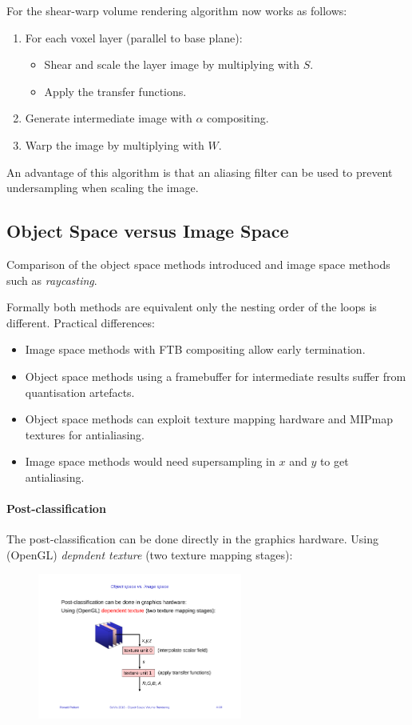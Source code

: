 For the shear-warp volume rendering algorithm now works as follows:
\begin{enumerate}
    \item For each voxel layer (parallel to base plane):
        \begin{itemize}
            \item Shear and scale the layer image by multiplying with $S$.
            \item Apply the transfer functions.
        \end{itemize}
    \item Generate intermediate image with $\alpha$ compositing.
    \item Warp the image by multiplying with $W$.
\end{enumerate}

An advantage of this algorithm is that an aliasing filter can be used to prevent undersampling when scaling the image.

\subsection{Object Space versus Image Space}
Comparison of the object space methods introduced and image space methods such as \emph{raycasting}.

Formally both methods are equivalent only the nesting order of the loops is different. Practical differences:
\begin{itemize}
    \item Image space methods with FTB compositing allow early termination.
    \item Object space methods using a framebuffer for intermediate results suffer from quantisation artefacts.
    \item Object space methods can exploit texture mapping hardware and MIPmap textures for antialiasing.
    \item Image space methods would need supersampling in $x$ and $y$ to get antialiasing.
\end{itemize}

\paragraph{Post-classification}
The post-classification can be done directly in the graphics hardware. Using (OpenGL) \emph{depndent texture} (two texture mapping stages):
\begin{figure}[H]
    \centering
    \includegraphics[width=0.6\textwidth]{img/04_object_space_dependent_texture}
\end{figure}

